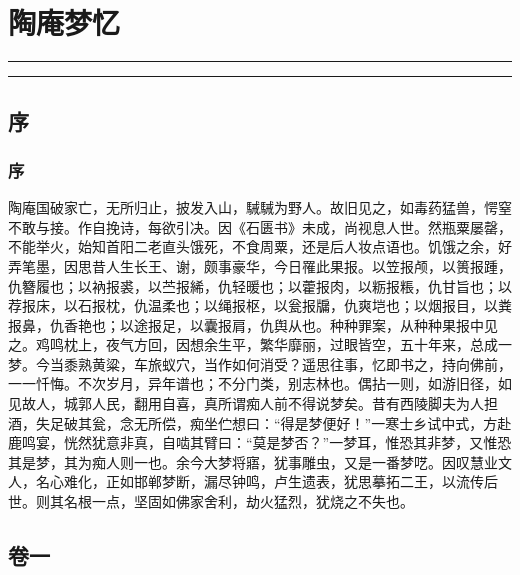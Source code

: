\documentclass[]{article}
\date{}
\begin{document}
\hypertarget{header-n0}{%
\section{陶庵梦忆}\label{header-n0}}

\begin{center}\rule{0.5\linewidth}{\linethickness}\end{center}

\tableofcontents

\begin{center}\rule{0.5\linewidth}{\linethickness}\end{center}

\hypertarget{header-n6}{%
\subsection{序}\label{header-n6}}

\hypertarget{header-n8}{%
\subsubsection{序}\label{header-n8}}

陶庵国破家亡，无所归止，披发入山，駴駴为野人。故旧见之，如毒药猛兽，愕窒不敢与接。作自挽诗，每欲引决。因《石匮书》未成，尚视息人世。然瓶粟屡罄，不能举火，始知首阳二老直头饿死，不食周粟，还是后人妆点语也。饥饿之余，好弄笔墨，因思昔人生长王、谢，颇事豪华，今日罹此果报。以笠报颅，以篑报踵，仇簪履也；以衲报裘，以苎报絺，仇轻暖也；以藿报肉，以粝报粻，仇甘旨也；以荐报床，以石报枕，仇温柔也；以绳报枢，以瓮报牖，仇爽垲也；以烟报目，以粪报鼻，仇香艳也；以途报足，以囊报肩，仇舆从也。种种罪案，从种种果报中见之。鸡鸣枕上，夜气方回，因想余生平，繁华靡丽，过眼皆空，五十年来，总成一梦。今当黍熟黄粱，车旅蚁穴，当作如何消受？遥思往事，忆即书之，持向佛前，一一忏悔。不次岁月，异年谱也；不分门类，别志林也。偶拈一则，如游旧径，如见故人，城郭人民，翻用自喜，真所谓痴人前不得说梦矣。昔有西陵脚夫为人担酒，失足破其瓮，念无所偿，痴坐伫想曰：``得是梦便好！''一寒士乡试中式，方赴鹿鸣宴，恍然犹意非真，自啮其臂曰：``莫是梦否？''一梦耳，惟恐其非梦，又惟恐其是梦，其为痴人则一也。余今大梦将寤，犹事雕虫，又是一番梦呓。因叹慧业文人，名心难化，正如邯郸梦断，漏尽钟鸣，卢生遗表，犹思摹拓二王，以流传后世。则其名根一点，坚固如佛家舍利，劫火猛烈，犹烧之不失也。

\hypertarget{header-n12}{%
\subsection{卷一}\label{header-n12}}
\end{document}
